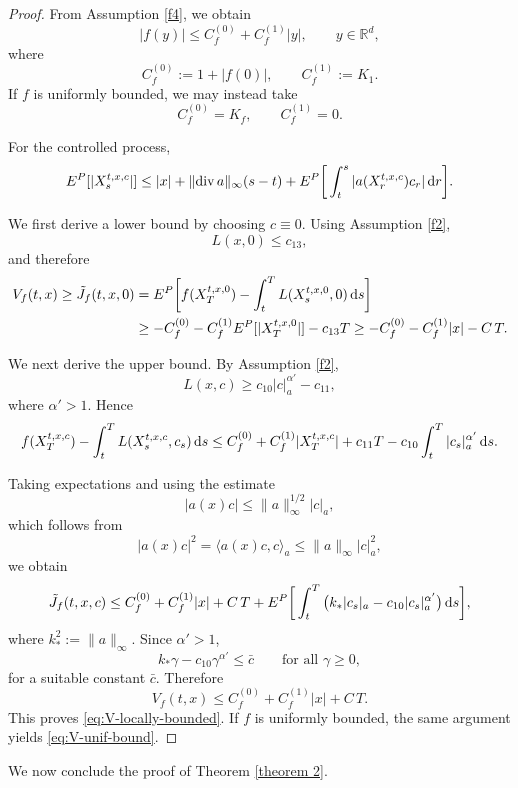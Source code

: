 \documentclass[11pt]{article}
\renewcommand{\d}{{\rm d}}
\newcommand{\R}{\mathbb R}
\theoremstyle{rem}
\begin{document}
\begin{proof}
From Assumption \ref{f4}, we obtain
\begin{equation}\label{eq:f.bound}
|f(y)|
\leq
C_f^{(0)}+C_f^{(1)}|y|,
\qquad
y\in\R^d,
\end{equation}
where
\[
C_f^{(0)}:=1+|f(0)|,
\qquad
C_f^{(1)}:=K_1.
\]
If $f$ is uniformly bounded, we may instead take
\[
C_f^{(0)}=K_f,
\qquad
C_f^{(1)}=0.
\]

For the controlled process,
\[
\begin{aligned}
E^P[|X_s^{t,x,c}|]
\leq
|x|
+
\|\mathrm{div}\,a\|_\infty(s-t)
+
E^P\bigg[
\int_t^s
|a(X_r^{t,x,c})c_r|
\,\d r
\bigg].
\end{aligned}
\]

We first derive a lower bound by choosing $c\equiv0$. Using Assumption \ref{f2},
\[
L(x,0)\leq c_{13},
\]
and therefore
\[
\begin{aligned}
V_f(t,x)
\geq
\tilde J_f(t,x,0)
&=
E^P\bigg[
f(X_T^{t,x,0})
-
\int_t^TL(X_s^{t,x,0},0)\,\d s
\bigg]
\\
&\geq
-
C_f^{(0)}
-
C_f^{(1)}E^P[|X_T^{t,x,0}|]
-
c_{13}T
\geq
-
C_f^{(0)}
-
C_f^{(1)}|x|
-
C\,T.
\end{aligned}
\]

We next derive the upper bound. By Assumption \ref{f2},
\[
L(x,c)
\geq
c_{10}|c|_a^{\alpha'}
-c_{11},
\]
where $\alpha'>1$. Hence
\[
\begin{aligned}
f(X_T^{t,x,c})
-
\int_t^T
L(X_s^{t,x,c},c_s)\,\d s
\leq
C_f^{(0)}
+
C_f^{(1)}|X_T^{t,x,c}|
+
c_{11}T
-
c_{10}\int_t^T|c_s|_a^{\alpha'}\,\d s.
\end{aligned}
\]

Taking expectations and using the estimate
\[
|a(x)c|
\leq
\|a\|_\infty^{1/2}|c|_a,
\]
which follows from
\[
|a(x)c|^2
=
\langle a(x)c,c\rangle_a
\leq
\|a\|_\infty |c|_a^2,
\]
we obtain
\[
\begin{aligned}
\tilde J_f(t,x,c)
\leq
C_f^{(0)}
+
C_f^{(1)}|x|
+
C\,T
+
E^P\bigg[
\int_t^T
\big(
k_*|c_s|_a
-
c_{10}|c_s|_a^{\alpha'}
\big)
\,\d s
\bigg],
\end{aligned}
\]
where $k_*^2:=\|a\|_\infty$. Since $\alpha'>1$,
\[
k_*\gamma-c_{10}\gamma^{\alpha'}
\leq
\bar c
\qquad
\text{for all }\gamma\geq0,
\]
for a suitable constant $\bar c$. Therefore
\[
V_f(t,x)
\leq
C_f^{(0)}
+
C_f^{(1)}|x|
+
C\,T.
\]
This proves \eqref{eq:V-locally-bounded}. If $f$ is uniformly bounded, the same argument yields \eqref{eq:V-unif-bound}.
\end{proof}

We now conclude the proof of Theorem \ref{theorem 2}.
\end{document}
